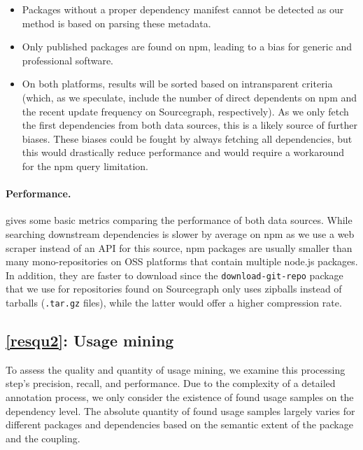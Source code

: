 \documentclass[a4paper,twoside]{article}
\begin{document}
\begin{itemize}
	\item Packages without a proper dependency manifest cannot be detected as our method is based on parsing these metadata.
	\item Only published packages are found on npm, leading to a bias for generic and professional software.
	\item On both platforms, results will be sorted based on intransparent criteria (which, as we speculate, include the number of direct dependents on npm and the recent update frequency on Sourcegraph, respectively).
	As we only fetch the first dependencies from both data sources, this is a likely source of further biases.
	These biases could be fought by always fetching all dependencies, but this would drastically reduce performance and would require a workaround for the npm query limitation.
\end{itemize}


\paragraph{Performance.}
\label{sec:evaluation/resqu1/performance}
 gives some basic metrics comparing the performance of both data sources.
While searching downstream dependencies is slower by average on npm as we use a web scraper instead of an API for this source, npm packages are usually smaller than many mono-repositories on OSS platforms that contain multiple node.js packages.
In addition, they are faster to download since the \texttt{download-git-repo} package that we use for repositories found on Sourcegraph only uses zipballs instead of tarballs (\texttt{.tar.gz} files), while the latter would offer a higher compression rate.


\subsection{\ref{resqu2}: Usage mining}
%
To assess the quality and quantity of usage mining, we examine this processing step's precision, recall, and performance.
Due to the complexity of a detailed annotation process, we only consider the existence of found usage samples on the dependency level.
The absolute quantity of found usage samples largely varies for different packages and dependencies based on the semantic extent of the package and the coupling.%
\end{document}
